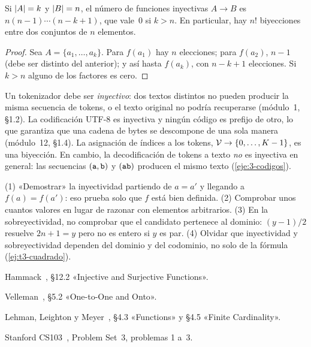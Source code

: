 \begin{proposicion}\label{prop:t3-contar-iny}
Si $\lvert A\rvert=k$ y $\lvert B\rvert=n$, el número de funciones inyectivas $A\to B$ es $n(n-1)\cdots(n-k+1)$, que vale~0 si $k>n$. En particular, hay $n!$ biyecciones entre dos conjuntos de $n$ elementos.
\end{proposicion}

\begin{proof}
Sea $A=\{a_1,\dots,a_k\}$. Para $f(a_1)$ hay $n$ elecciones; para $f(a_2)$, $n-1$ (debe ser distinto del anterior); y así hasta $f(a_k)$, con $n-k+1$ elecciones. Si $k>n$ alguno de los factores es cero.
\end{proof}

\begin{observacion}
Un tokenizador debe ser \emph{inyectivo}: dos textos distintos no pueden producir la misma secuencia de tokens, o el texto original no podría recuperarse (módulo~1, §1.2). La codificación UTF-8 es inyectiva y ningún código es prefijo de otro, lo que garantiza que una cadena de bytes se descompone de una sola manera (módulo~12, §1.4). La asignación de índices a los tokens, $\mathcal{V}\to\{0,\dots,K-1\}$, es una biyección. En cambio, la decodificación de tokens a texto \emph{no} es inyectiva en general: las secuencias $(\texttt{a},\texttt{b})$ y $(\texttt{ab})$ producen el mismo texto (\cref{eje:3-codigos}).
\end{observacion}

\begin{observacion}
(1) «Demostrar» la inyectividad partiendo de $a=a'$ y llegando a $f(a)=f(a')$: eso prueba solo que $f$ está bien definida. (2) Comprobar unos cuantos valores en lugar de razonar con elementos arbitrarios. (3) En la sobreyectividad, no comprobar que el candidato pertenece al dominio: $(y-1)/2$ resuelve $2n+1=y$ pero no es entero si $y$ es par. (4) Olvidar que inyectividad y sobreyectividad dependen del dominio y del codominio, no solo de la fórmula (\cref{ej:t3-cuadrado}).
\end{observacion}

\begin{lecturas}
\item Hammack~\cite{hammack}, §12.2 «Injective and Surjective Functions».
\item Velleman~\cite{velleman}, §5.2 «One-to-One and Onto».
\item Lehman, Leighton y Meyer~\cite{mcs}, §4.3 «Functions» y §4.5 «Finite Cardinality».
\item Stanford CS103~\cite{cs103ps3}, Problem Set~3, problemas 1 a~3.
\end{lecturas}

